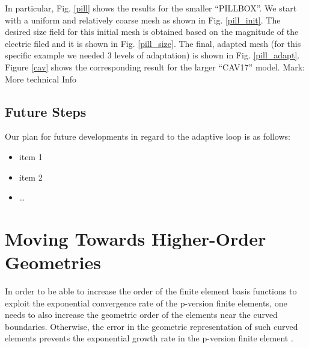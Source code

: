 \documentclass[review,12pt]{elsarticle_summary_report}
\begin{document}
In particular, Fig. \ref{pill} shows the results for the smaller ``PILLBOX''. We start with a uniform and relatively coarse mesh as shown in Fig. \ref{pill_init}. The desired size field for this initial mesh is obtained based on the magnitude of the electric filed and it is shown in Fig. \ref{pill_size}. The final, adapted mesh (for this specific example we needed 3 levels of adaptation) is shown in Fig. \ref{pill_adapt}. Figure \ref{cav} shows the corresponding result for the larger ``CAV17'' model. \color{blue} Mark: More technical Info \color{black}

\subsection{\label{adaptive_loop_future} Future Steps}

Our plan for future developments in regard to the adaptive loop is as follows:
\begin{itemize}
  \item item 1
  \item item 2
  \item \dots
\end{itemize}



\section{\label{high_order_geom}Moving Towards Higher-Order Geometries}

In order to be able to increase the order of the finite element basis functions to exploit the exponential convergence rate of the p-version finite elements, one needs to also increase the geometric order of the elements near the curved boundaries. Otherwise, the error in the geometric representation of such curved elements prevents the exponential growth rate in the p-version finite element \cite{LuoShephard_04, DeyShephard_97, LuoShephard_02}.
\end{document}
